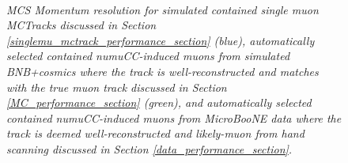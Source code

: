 \begin{figure}
\centering
\mbox{
	\quad
	}
\caption{\textit{MCS Momentum resolution for simulated contained single muon {\sc MCTracks} discussed in Section \ref{singlemu_mctrack_performance_section} (blue), automatically selected contained numuCC-induced muons from simulated BNB+cosmics where the track is well-reconstructed and matches with the true muon track discussed in Section \ref{MC_performance_section} (green), and automatically selected contained numuCC-induced muons from MicroBooNE data where the track is deemed well-reconstructed and likely-muon from hand scanning discussed in Section \ref{data_performance_section}.}}
\label{MCS_range_bias_resolution_masteroverlay_fig}
\end{figure}












